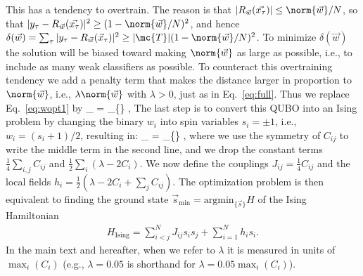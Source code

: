 This has a tendency to overtrain. The reason is that $|R_{\vec{w}}(\vec{x_\tau})| \leq {\norm{\vec{w}}}/{N}$, so that $|y_\tau-R_{\vec{w}}(\vec{x_\tau})|^2 \geq (1-\norm{\vec{w}}/{N})^2$, and hence $\delta(\vec{w}) = \sum_\tau |y_\tau-R_{\vec{w}}(\vec{x}_\tau)|^2 \geq |\mc{T}| (1-{\norm{\vec{w}}}/{N})^2$. To minimize $\delta(\vec{w})$ the solution will be biased toward making $\norm{\vec{w}}$ as large as possible, i.e., to include as many weak classifiers as possible. To counteract this overtraining tendency we add a penalty term that makes the distance larger in proportion to $\norm{\vec{w}}$, i.e., $\lambda\norm{\vec{w}}$ with $\lambda>0$, just as in Eq.~\eqref{eq:full}. Thus we replace Eq.~\eqref{eq:wopt1} by
\beq
{}_{\min}  = _{\{\}}  ,
\label{eq:wopt2}
\eeq
The last step is to convert this QUBO into an Ising problem by changing the binary $w_i$ into spin variables $s_i=\pm 1$, i.e., $w_i= (s_i+1)/2$, resulting in:
\beq
{}_{\min}  = _{\{\}}  ,
\eeq
where we use the symmetry of $C_{ij}$ to write the middle term in the second line, and we drop the constant terms $\frac{1}{4}\sum_{i,j} C_{ij}$ and $\frac{1}{2}\sum_i (\lambda-2C_i)$.
We now define the couplings $J_{ij} = \frac{1}{4} C_{ij}$ and the local fields $h_i=\frac{1}{2}\left(\lambda-2C_i+\sum_{j}C_{ij} \right)$. The optimization problem is then equivalent to finding the ground state 
$\vec{s}_{\min} = \mathrm{argmin}_{\{\vec{s}\}} H$ of the Ising Hamiltonian
 \begin{align}
 		H_{\mathrm{Ising}} =  \sum_{i<j}^{N} J_{ij} s_i s_j + \sum_{i=1}^{N} h_i s_i .
		\label{eq:HIsing}
 \end{align}
In the main text and hereafter, when we refer to $\lambda$ it is measured in units of $\max_i(C_i)$ (e.g., $\lambda=0.05$ is shorthand for $\lambda=0.05\max_i(C_i)$).
 
 


